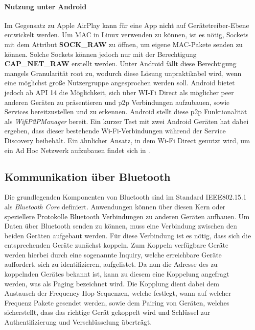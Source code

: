         \paragraph{Nutzung unter Android}
        Im Gegensatz zu Apple AirPlay kann für eine App nicht auf Gerätetreiber-Ebene entwickelt werden. Um MAC in Linux verwenden zu können, ist es nötig, Sockets mit dem Attribut {\bf SOCK\_RAW} zu öffnen,
        um eigene MAC-Pakete senden zu können. Solche Sockets können jedoch nur mit der Berechtigung {\bf CAP\_NET\_RAW} erstellt werden.\cite{linuxPacket}
        Unter Android fällt diese Berechtigung mangels Granularität root zu, wodurch diese Lösung unpraktikabel wird,
        wenn eine möglichst große Nutzergruppe angesprochen werden soll.\cite{androidRights}
        Android bietet jedoch ab API 14 die Möglichkeit, sich über WI-Fi Direct als möglicher peer anderen Geräten zu präsentieren und
        p2p Verbindungen aufzubauen, sowie Services bereitzustellen und zu erkennen.
        Android stellt diese p2p Funktionalität als {\it WifiP2PManager} bereit. Ein kurzer Test mit zwei Android Geräten hat dabei ergeben,
        dass dieser bestehende Wi-Fi-Verbindungen während der Service Discovery beibehält.\cite{test-repository}
        Ein ähnlicher Ansatz, in dem Wi-Fi Direct genutzt wird, um ein Ad Hoc Netzwerk aufzubauen findet sich in \cite{Aneja}.

    \subsection{Kommunikation über Bluetooth}
        Die grundlegenden Komponenten von Bluetooth sind im Standard IEEE802.15.1 als {\it Bluetooth Core} definiert. Anwendungen können über diesen Kern oder speziellere Protokolle Bluetooth
        Verbindungen zu anderen Geräten aufbauen.\cite[S.228]{Lueders}
        Um Daten über Bluetooth senden zu können, muss eine Verbindung zwischen den beiden Geräten aufgebaut werden. Für diese Verbindung ist es nötig,
        dass sich die entsprechenden Geräte zunächst koppeln. Zum Koppeln verfügbare Geräte werden hierbei durch eine sogenannte Inquiry, welche erreichbare Geräte auffordert,
        sich zu identifizieren, aufgelistet. Da nun die Adresse des zu koppelnden Gerätes bekannt ist, kann zu diesem eine Koppelung angefragt werden, was als Paging bezeichnet wird.
        Die Kopplung dient dabei dem Austausch der Frequency Hop Sequenzen, welche festlegt, wann auf welcher Frequenz Pakete gesendet werden, sowie dem Pairing von Geräten, welches sicherstellt,
        dass das richtige Gerät gekoppelt wird und Schlüssel zur Authentifizierung und Verschlüsselung überträgt.\cite[S.402f.]{Sauter}

